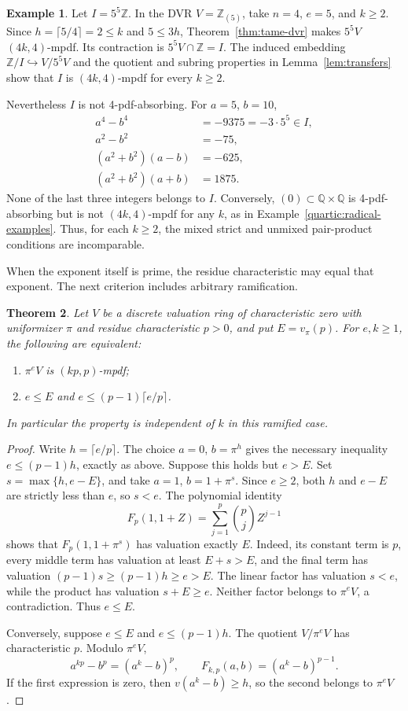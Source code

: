 \documentclass[11pt,a4paper]{amsart}
\newtheorem{theorem}{Theorem}[section]
\theoremstyle{definition}
\newtheorem{example}[theorem]{Example}
\theoremstyle{remark}
\newcommand{\Z}{\mathbb Z}
\newcommand{\Q}{\mathbb Q}
\numberwithin{equation}{section}
\begin{document}
\begin{example}\label{quartic:mixed-separation}
Let $I=5^5\Z$. In the DVR $V=\Z_{(5)}$, take $n=4$, $e=5$,
and $k\ge2$. Since $h=\lceil5/4\rceil=2\le k$ and $5\le3h$,
Theorem~\ref{thm:tame-dvr} makes $5^5V$ $(4k,4)$-mpdf.
Its contraction is $5^5V\cap\Z=I$. The induced embedding
$\Z/I\hookrightarrow V/5^5V$ and the quotient and subring
properties in Lemma~\ref{lem:transfers} show that $I$ is
$(4k,4)$-mpdf for every $k\ge2$.

Nevertheless $I$ is not 4-pdf-absorbing. For $a=5$, $b=10$,
\[
 \begin{aligned}
 a^4-b^4&=-9375=-3\cdot5^5\in I,\\
 a^2-b^2&=-75,\\
 (a^2+b^2)(a-b)&=-625,\\
 (a^2+b^2)(a+b)&=1875.
 \end{aligned}
\]
None of the last three integers belongs to $I$.
Conversely, $(0)\subset\Q\times\Q$ is 4-pdf-absorbing but is
not $(4k,4)$-mpdf for any $k$, as in
Example~\ref{quartic:radical-examples}. Thus, for each $k\ge2$,
the mixed strict and unmixed pair-product conditions are incomparable.
\end{example}

When the exponent itself is prime, the residue characteristic may equal
that exponent. The next criterion includes arbitrary ramification.

\begin{theorem} \label{thm:ramified-prime}
Let $V$ be a discrete valuation ring of characteristic zero with
uniformizer $\pi$ and residue characteristic $p>0$, and put $E=v_\pi(p)$.
For $e,k\ge1$, the following are equivalent:
\begin{enumerate}
\item $\pi^eV$ is $(kp,p)$-mpdf;
\item $e\le E$ and $e\le(p-1)\lceil e/p\rceil$.
\end{enumerate}
In particular the property is independent of $k$ in this ramified case.
\end{theorem}
\begin{proof}
Write $h=\lceil e/p\rceil$. The choice $a=0$, $b=\pi^h$ gives the
necessary inequality $e\le(p-1)h$, exactly as above.
Suppose this holds but $e>E$. Set $s=\max\{h,e-E\}$, and take
$a=1$, $b=1+\pi^s$. Since $e\ge2$, both $h$ and $e-E$ are strictly less
than $e$, so $s<e$. The polynomial identity
\[
 F_p(1,1+Z)=\sum_{j=1}^p\binom pj Z^{j-1}
\]
shows that $F_p(1,1+\pi^s)$ has valuation exactly $E$.
Indeed, its constant term is $p$, every middle term has valuation
at least $E+s>E$, and the final term has valuation
$(p-1)s\ge(p-1)h\ge e>E$.
The linear factor has valuation $s<e$, while the product has valuation
$s+E\ge e$. Neither factor belongs to $\pi^eV$, a contradiction.
Thus $e\le E$.

Conversely, suppose $e\le E$ and $e\le(p-1)h$.
The quotient $V/\pi^eV$ has characteristic $p$. Modulo $\pi^eV$,
\[
 a^{kp}-b^p=(a^k-b)^p,
 \qquad F_{k,p}(a,b)=(a^k-b)^{p-1}.
\]
If the first expression is zero, then $v(a^k-b)\ge h$, so the
second belongs to $\pi^eV$.
\end{proof}
\end{document}
